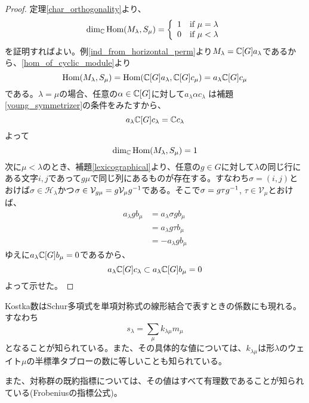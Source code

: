 \documentclass{ltjsreport}
\begin{document}
\begin{proof}
  定理\ref{char_orthogonality}より、
  \[
  \dim_{\mathbb{C}}\text{Hom}(M_\lambda,S_\mu)=
  \left\{\begin{array}{cc}
    1 & \text{if $\mu=\lambda$}\\
    0 & \text{if $\mu<\lambda$}
  \end{array}\right.  
  \]
  を証明すればよい。例\ref{ind_from_horizontal_perm}より$M_\lambda=\mathbb{C}[G]a_\lambda$であるから、\ref{hom_of_cyclic_module}より
  \[
  \text{Hom}(M_\lambda,S_\mu)=\text{Hom}(\mathbb{C}[G]a_\lambda,\mathbb{C}[G]c_\mu)=a_\lambda\mathbb{C}[G]c_\mu 
  \]
  である。$\lambda=\mu$の場合、任意の$\alpha\in\mathbb{C}[G]$に対して$a_\lambda\alpha c_\lambda$ は補題\ref{young_symmetrizer}の条件をみたすから、
  \[
  a_\lambda\mathbb{C}[G]c_\lambda=\mathbb{C} c_\lambda
  \]
  よって
  \[
  \dim_{\mathbb{C}}\text{Hom}(M_\lambda,S_\mu)=1  
  \]
  次に$\mu<\lambda$のとき、補題\ref{lexicographical}より、任意の$g\in G$に対して$\lambda$の同じ行にある文字$i,j$であって$g\mu$で同じ列にあるものが存在する。すなわち$\sigma=(i,j)$とおけば$\sigma\in \mathcal{H}_\lambda$かつ$\sigma\in\mathcal{V}_{g\mu}=g\mathcal{V}_{\mu}g^{-1}$である。そこで$\sigma=g\tau g^{-1}$, $\tau\in\mathcal{V}_\mu$とおけば、
  \begin{align*}
    a_\lambda g b_\mu
    &=a_\lambda\sigma g b_\mu\\
    &=a_\lambda g\tau b_\mu\\
    &=-a_\lambda g b_\mu
  \end{align*}
  ゆえに$a_\lambda\mathbb{C}[G]b_\mu=0$であるから、
  \[
  a_\lambda\mathbb{C}[G]c_\lambda\subset a_\lambda\mathbb{C}[G]b_\mu=0
  \]
  よって示せた。
\end{proof}

Kostka数はSchur多項式を単項対称式の線形結合で表すときの係数にも現れる。すなわち
\[
s_\lambda=\sum_{\mu}k_{\lambda\mu}m_\mu  
\]
となることが知られている。また、その具体的な値については、$k_{\lambda\mu}$は形$\lambda$のウェイト$\mu$の半標準タブローの数に等しいことも知られている。

また、対称群の既約指標については、その値はすべて有理数であることが知られている(Frobeniusの指標公式)。
\end{document}
